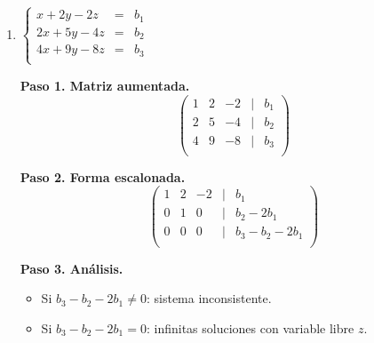 \begin{prob}
\begin{enumerate}[$a)$]
\begin{myproof}
    \textbf{Paso 2. Solución paramétrica.} La variable libre es $x_3$:
    \[
    \boxed{\begin{pmatrix} x_1 \\ x_2 \\ x_3 \end{pmatrix} =
    \begin{pmatrix} -1 \\ \frac{5}{2} \\ 0 \end{pmatrix} +
    x_3 \begin{pmatrix} 0 \\ \frac{1}{2} \\ 1 \end{pmatrix}}, \quad x_3 \in \mathbb{R}.
    \]
    \end{myproof}

 \item $ \left\lbrace\begin{array}{ccc}
x+2y-2z&=&b_1\\
2x+5y-4z&=&b_2\\
4x+9y-8z&=&b_3\\
\end{array} \right.  $ 
    
    \begin{myproof}
    \textbf{Paso 1. Matriz aumentada.}
    \[
    \begin{pmatrix}
    1 & 2 & -2 & | & b_1 \\
    2 & 5 & -4 & | & b_2 \\
    4 & 9 & -8 & | & b_3 \\
    \end{pmatrix}
    \]

    \textbf{Paso 2. Forma escalonada.}
    \[
    \begin{pmatrix}
    1 & 2 & -2 & | & b_1 \\
    0 & 1 & 0 & | & b_2 - 2b_1 \\
    0 & 0 & 0 & | & b_3 - b_2 - 2b_1 \\
    \end{pmatrix}
    \]
    
    \textbf{Paso 3. Análisis.}
    \begin{itemize}
    \item Si $b_3 - b_2 - 2b_1 \neq 0$: sistema inconsistente.
    \item Si $b_3 - b_2 - 2b_1 = 0$: infinitas soluciones con variable libre $z$.
    \end{itemize}


\end{myproof}
\end{enumerate}
\end{prob}
